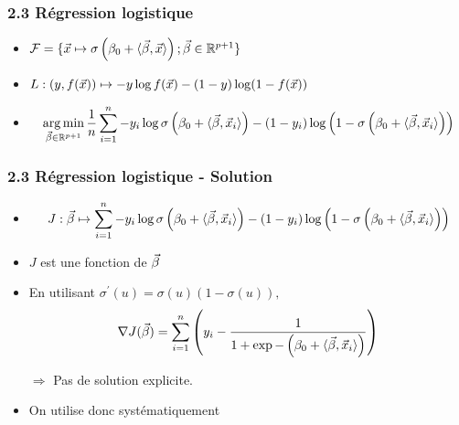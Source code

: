 \begin{frame}
  \frametitle{2.3 Régression logistique}
  \begin{itemize}
  \item {}
    $\mathcal{F} = \{\vec{x} \mapsto \sigma\left(\beta_0 + \langle \vec{\beta}, \vec{x}
      \rangle\right) ; \vec{\beta} \in {\mathbb R}^{p+1}\}$
  \item {}
    $L : (y, f(\vec{x}))  \mapsto -y \log f(\vec{x}) - (1-y) \log (1 - f(\vec{x}))$
  \item {}
    \footnotesize
    \[\operatorname*{arg\,min}_{\vec{\beta} \in {\mathbb R}^{p+1}} \frac1n \sum_{i=1}^n
      -y_i \log \sigma\left(\beta_0 + \langle \vec{\beta}, \vec{x}_i \rangle\right)
      - (1-y_i) \log \left(1 - \sigma\left(\beta_0 + \langle \vec{\beta}, \vec{x}_i \rangle\right)\right)
    \]
  \end{itemize}
\end{frame}

\begin{frame}
  \frametitle{2.3 Régression logistique - Solution}
  \begin{itemize}
  \item {}
    {\footnotesize \[J : \vec{\beta} \mapsto \sum_{i=1}^n -y_i \log \sigma\left(\beta_0 + \langle
      \vec{\beta}, \vec{x}_i \rangle\right) - (1-y_i) \log \left(1 -
      \sigma\left(\beta_0 + \langle \vec{\beta}, \vec{x}_i \rangle\right)\right)\]}
  \pause
  \item $J$ est une fonction  de $\vec{\beta}$
  \pause
  \item En utilisant $\sigma^\prime (u) = \sigma(u) (1-\sigma(u)),$
    \[
      \nabla J(\vec{\beta}) = \sum_{i=1}^n \left( y_i - \frac1{1 + \exp - \left(\beta_0 +
            \langle \vec{\beta}, \vec{x}_i \rangle \right)} \right)
    \]
  \item[$\Rightarrow$] Pas de solution explicite.
    \pause
  \item On utilise donc systématiquement 
  \end{itemize}
\end{frame}

